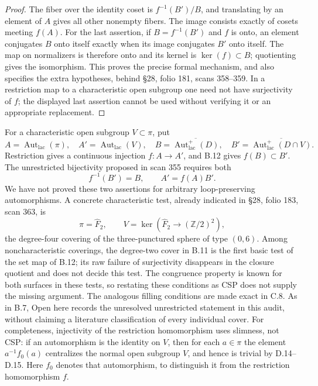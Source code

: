 \begin{proof}
The fiber over the identity coset is $f^{-1}(B')/B$, and translating
by an element of $A$ gives all other nonempty fibers.  The image
consists exactly of cosets meeting $f(A)$.  For the last assertion,
if $B=f^{-1}(B')$ and $f$ is onto, an element conjugates $B$ onto
itself exactly when its image conjugates $B'$ onto itself.
The map on normalizers is therefore onto and its kernel is
$\ker(f)\subset B$; quotienting gives the isomorphism.
This proves the precise formal mechanism, and also specifies the
extra hypotheses, behind \S28, folio 181, scans 358--359.  In a
restriction map to a characteristic open subgroup one need not
have surjectivity of $f$; the displayed last assertion cannot be
used without verifying it or an appropriate replacement.
\end{proof}

For a characteristic open subgroup $V\subset\pi$, put
\[
 A=\operatorname{Aut}_{\mathrm{lac}}(\pi),\quad
 A'=\operatorname{Aut}_{\mathrm{lac}}(V),\quad
 B=\overline{\operatorname{Aut}_{\mathrm{lac}}^+(D)},\quad
 B'=\overline{\operatorname{Aut}_{\mathrm{lac}}^+(D\cap V)}.
\]
Restriction gives a continuous injection $f:A\to A'$, and B.12
gives $f(B)\subset B'$.  The unrestricted bijectivity proposed in
scan 355 requires both
\[
 f^{-1}(B')=B,\qquad A'=f(A)B'.
\]
We have not proved these two assertions for arbitrary
loop-preserving automorphisms.  A concrete characteristic test,
already indicated in \S28, folio 183, scan 363, is
\[
 \pi=\widehat F_2,\qquad
 V=\ker(\widehat F_2\to(\mathbb Z/2)^2),
\]
the degree-four covering of the three-punctured sphere of type
$(0,6)$.  Among noncharacteristic coverings, the degree-two cover
in B.11 is the first basic test of the set map of B.12; its raw
failure of surjectivity disappears in the closure quotient and
does not decide this test.  The congruence property is known for
both surfaces in these tests, so restating these conditions as
CSP does not supply the missing argument.  The analogous filling
conditions are made exact in C.8.  As in B.7, Open here records
the unresolved unrestricted statement in this audit, without
claiming a literature classification of every individual cover.
For completeness, injectivity of the restriction homomorphism
uses slimness, not CSP: if an automorphism is the identity on
$V$, then for each $a\in\pi$ the element $a^{-1}f_0(a)$
centralizes the normal open subgroup $V$, and hence is trivial
by D.14--D.15.  Here $f_0$ denotes that automorphism, to
distinguish it from the restriction homomorphism $f$.

